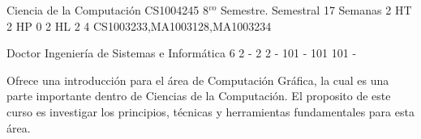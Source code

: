 \documentclass[a4paper,8pt]{article}
\begin{document}
\setNombreProfesor{}
\setGradoProfesorAbreviado{}
\sylabusHeader

\academicaTable
{Ciencia de la Computación} %
{CS1004245} %
{8$^{vo}$ Semestre.} %
{Semestral} %
{17 Semanas} %
{2 HT} %
{2 HP} %
{0} %
{2 HL}  %
{2} %
{4} %
{CS1003233,MA1003128,MA1003234} %

\administrativaTable
{Doctor} %
{Ingeniería de Sistemas e Informática} %
{6} %
{2} %
{-} %
{2} %
{2} %
{-} %
{101} %
{-} %
{101} %
{101} %
{-} %


\begin{fundamentacion}
Ofrece una introducción para el área de Computación Gráfica, la cual es una parte importante dentro de Ciencias de la
Computación. El proposito de este curso es investigar los principios, técnicas y herramientas fundamentales para esta área.

\end{fundamentacion}

\begin{sumilla}
\item \GVFundamentalConcepts
\item \GVBasicRendering
\item \HCIProgrammingInteractiveSystems
\item \GVGeometricModeling
\item \GVAdvancedRendering
\item \GVComputerAnimation

\end{sumilla}

\begin{competenciasAsignatura}
\item {}
\item {}
\item {}
\item {}
\item {}

\end{competenciasAsignatura}
\end{document}
